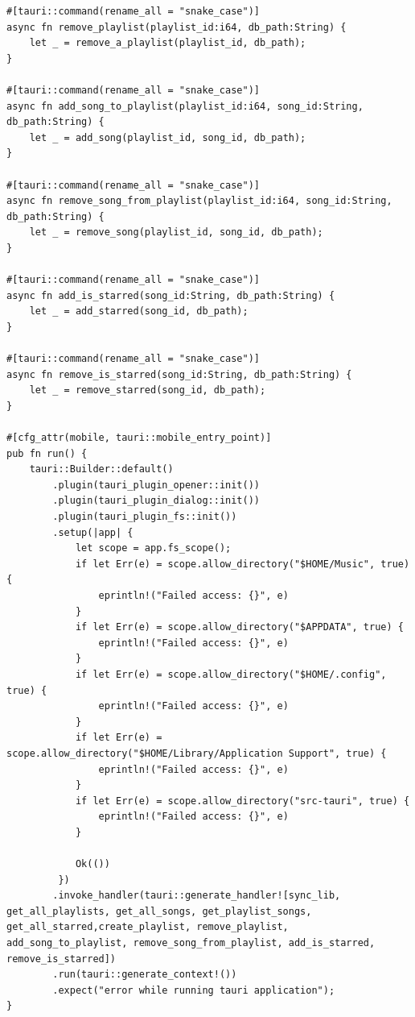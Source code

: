 \documentclass[11pt, a4paper]{article}
\begin{document}
\begin{lstlisting}[caption={lib.rs}]
#[tauri::command(rename_all = "snake_case")]
async fn remove_playlist(playlist_id:i64, db_path:String) {
    let _ = remove_a_playlist(playlist_id, db_path);
}

#[tauri::command(rename_all = "snake_case")]
async fn add_song_to_playlist(playlist_id:i64, song_id:String, db_path:String) {
    let _ = add_song(playlist_id, song_id, db_path);
}

#[tauri::command(rename_all = "snake_case")]
async fn remove_song_from_playlist(playlist_id:i64, song_id:String, db_path:String) {
    let _ = remove_song(playlist_id, song_id, db_path);
}

#[tauri::command(rename_all = "snake_case")]
async fn add_is_starred(song_id:String, db_path:String) {
    let _ = add_starred(song_id, db_path);
}

#[tauri::command(rename_all = "snake_case")]
async fn remove_is_starred(song_id:String, db_path:String) {
    let _ = remove_starred(song_id, db_path);
}

#[cfg_attr(mobile, tauri::mobile_entry_point)]
pub fn run() {
    tauri::Builder::default()
        .plugin(tauri_plugin_opener::init())
        .plugin(tauri_plugin_dialog::init())
        .plugin(tauri_plugin_fs::init())
        .setup(|app| {
            let scope = app.fs_scope();
            if let Err(e) = scope.allow_directory("$HOME/Music", true) {
                eprintln!("Failed access: {}", e)
            }
            if let Err(e) = scope.allow_directory("$APPDATA", true) {
                eprintln!("Failed access: {}", e)
            }
            if let Err(e) = scope.allow_directory("$HOME/.config", true) {
                eprintln!("Failed access: {}", e)
            }
            if let Err(e) = scope.allow_directory("$HOME/Library/Application Support", true) {
                eprintln!("Failed access: {}", e)
            }
            if let Err(e) = scope.allow_directory("src-tauri", true) {
                eprintln!("Failed access: {}", e)
            }
            
            Ok(())
         })
        .invoke_handler(tauri::generate_handler![sync_lib, get_all_playlists, get_all_songs, get_playlist_songs, get_all_starred,create_playlist, remove_playlist, add_song_to_playlist, remove_song_from_playlist, add_is_starred, remove_is_starred])
        .run(tauri::generate_context!())
        .expect("error while running tauri application");
}
              
            \end{lstlisting}
            
\end{document}
